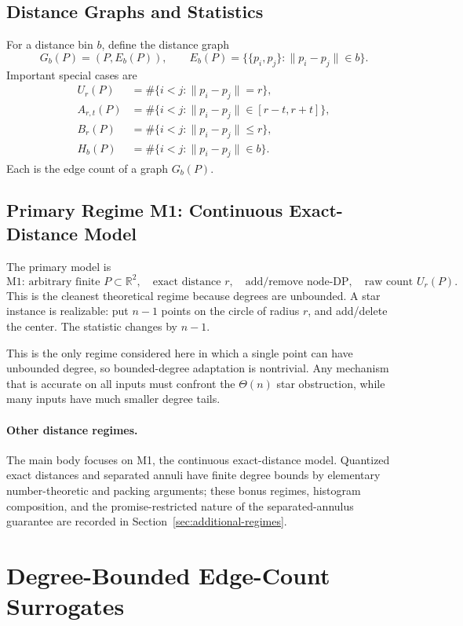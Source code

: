 \documentclass[11pt]{article}
\newcommand{\R}{\mathbb{R}}
\begin{document}
\subsection{Distance Graphs and Statistics}

For a distance bin \(b\), define the distance graph
\[
G_b(P)=(P,E_b(P)),\qquad
E_b(P)=\bigl\{\{p_i,p_j\}:\|p_i-p_j\|\in b\bigr\}.
\]
Important special cases are
\begin{align*}
U_r(P)&=\#\{i<j:\|p_i-p_j\|=r\},\\
A_{r,t}(P)&=\#\{i<j:\|p_i-p_j\|\in [r-t,r+t]\},\\
B_r(P)&=\#\{i<j:\|p_i-p_j\|\le r\},\\
H_b(P)&=\#\{i<j:\|p_i-p_j\|\in b\}.
\end{align*}
Each is the edge count of a graph \(G_b(P)\).

\subsection{Primary Regime M1: Continuous Exact-Distance Model}

The primary model is
\[
\text{M1: arbitrary finite }P\subset \R^2,\quad \text{exact distance }r,\quad \text{add/remove node-DP},\quad \text{raw count }U_r(P).
\]
This is the cleanest theoretical regime because degrees are unbounded. A star instance is realizable: put \(n-1\) points on the circle of radius \(r\), and add/delete the center. The statistic changes by \(n-1\).

This is the only regime considered here in which a single point can have unbounded degree, so bounded-degree adaptation is nontrivial. Any mechanism that is accurate on all inputs must confront the \(\Theta(n)\) star obstruction, while many inputs have much smaller degree tails.


\paragraph{Other distance regimes.}
The main body focuses on M1, the continuous exact-distance model. Quantized exact distances and separated annuli have finite degree bounds by elementary number-theoretic and packing arguments; these bonus regimes, histogram composition, and the promise-restricted nature of the separated-annulus guarantee are recorded in Section~\ref{sec:additional-regimes}.

\section{Degree-Bounded Edge-Count Surrogates}
\label{sec:surrogates}
\end{document}
